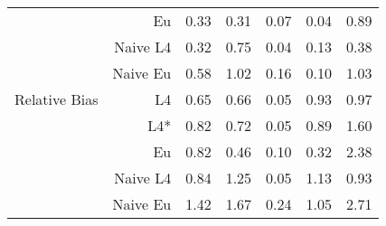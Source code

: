 \documentclass[a4paper,12pt,twoside]{book}
\begin{document}
\begin{table}[H]
\begin{tabular}{crrrrrr}
  
&Eu &   0.33 & 0.31 & 0.07 & 0.04 & 0.89 \\ 
  
&Naive L4&  
   0.32 & 0.75 & 0.04 & 0.13 & 0.38 \\ 
   
&Naive Eu &  0.58 & 1.02 & 0.16 & 0.10 & 1.03 \\ 
  
   \hline
   
{\color{blue} Relative Bias } & L4  &0.65 & 0.66 & 0.05 & 0.93 & 0.97 \\ 
 
&L4*  &  0.82 & 0.72 & 0.05 & 0.89 & 1.60 \\ 
   
  
&Eu &  
 0.82 & 0.46 & 0.10 & 0.32 & 2.38 \\ 
  
&Naive L4&  
   0.84 & 1.25 & 0.05 & 1.13 & 0.93 \\
  
  
&Naive Eu &  
 1.42 & 1.67 & 0.24 & 1.05 & 2.71 \\ 
 
 
  
\end{tabular}

\end{table}
\end{document}
